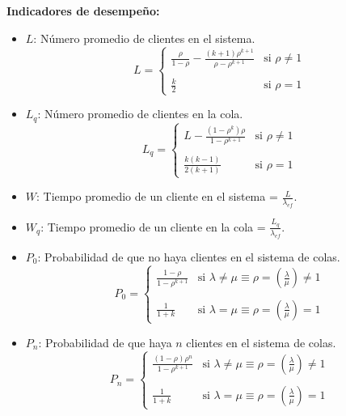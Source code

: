 \documentclass{templateNote}
\begin{document}
\textbf{Indicadores de desempeño:}
\begin{itemize}
    \item $L$: Número promedio de clientes en el sistema.
    \[
    L = \left\{
        \begin{array}{ll}
        \frac{\rho}{1-\rho} - \frac{(k+1)\rho^{k+1}}{\rho - \rho^{k+1}} &    \text{si } \rho \neq 1 \\\\
        \frac{k}{2} &                                                        \text{si } \rho = 1
        \end{array}
      \right.
    \]  
    \item $L_q$: Número promedio de clientes en la cola.
    \[
    L_q = \left\{
        \begin{array}{ll}
        L - \frac{(1-\rho^k)\rho}{1-\rho^{k+1}} &    \text{si } \rho \neq 1 \\\\
        \frac{k(k-1)}{2(k+1)} &                        \text{si } \rho = 1
        \end{array}
      \right.
    \]
    \item $W$: Tiempo promedio de un cliente en el sistema = $\frac{L}{\lambda_{ef}}$.
    \item $W_q$: Tiempo promedio de un cliente en la cola = $\frac{L_q}{\lambda_{ef}}$.
    \item $P_0$: Probabilidad de que no haya clientes en el sistema de colas.
    \[
    P_0 = \left\{
        \begin{array}{ll}
        \frac{1-\rho}{1-\rho^{k+1}} &    \text{si } \lambda \neq \mu \equiv \rho = (\frac{\lambda}{\mu}) \neq 1  \\\\
        \frac{1}{1+k} &                  \text{si } \lambda = \mu \equiv \rho = (\frac{\lambda}{\mu}) = 1
        \end{array}
      \right.
    \]
    \item $P_n$: Probabilidad de que haya $n$ clientes en el sistema de colas.
    \[
    P_n = \left\{
        \begin{array}{ll}
        \frac{(1-\rho)\rho^n}{1-\rho^{k+1}} &    \text{si } \lambda \neq \mu \equiv \rho = (\frac{\lambda}{\mu}) \neq 1  \\\\
        \frac{1}{1+k} &                  \text{si } \lambda = \mu \equiv \rho = (\frac{\lambda}{\mu}) = 1
        \end{array}
      \right.
    \]
\end{itemize}
\end{document}
